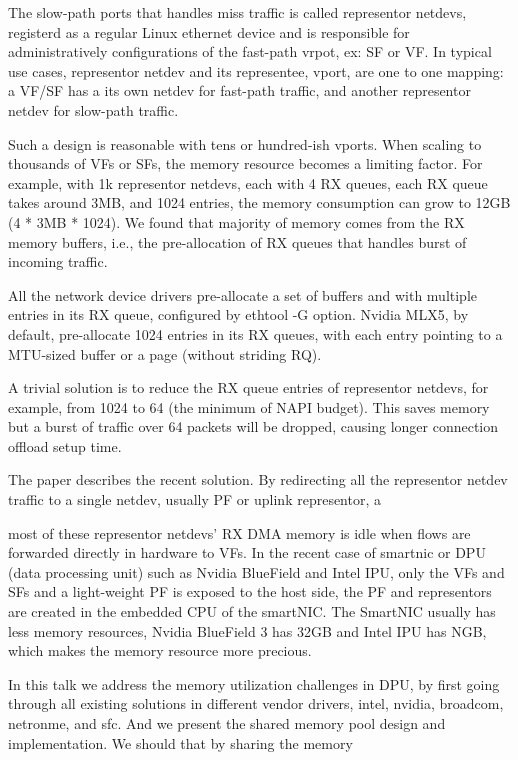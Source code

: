 \documentclass[letterpaper]{article}
\begin{document}
The slow-path ports that handles miss traffic is called representor
netdevs, registerd as a regular Linux ethernet device and is responsible
for administratively configurations of the fast-path vrpot, ex: SF or VF.
In typical use cases, representor netdev and its representee, vport,
are one to one mapping: a VF/SF has a its own netdev for fast-path traffic,
and another representor netdev for slow-path traffic.

Such a design is reasonable with tens or hundred-ish vports. When scaling
to thousands of VFs or SFs, the memory resource becomes a limiting factor.
For example, with 1k representor netdevs, each with 4 RX queues, each RX
queue takes around 3MB, and 1024 entries, the memory consumption can grow
to 12GB (4 * 3MB * 1024). We found that majority of memory comes from
the RX memory buffers, i.e., the pre-allocation of RX queues that handles
burst of incoming traffic.

All the network device drivers pre-allocate a set of buffers and with
multiple entries in its RX queue, configured by ethtool -G option.
Nvidia MLX5, by default, pre-allocate 1024 entries in its RX queues,
with each entry pointing to a MTU-sized buffer or a page (without
striding RQ).

A trivial solution is to reduce the RX queue entries of representor
netdevs, for example, from 1024 to 64 (the minimum of NAPI budget).
This saves memory but a burst of traffic over 64 packets will be dropped,
causing longer connection offload setup time.

The paper describes the recent solution. By redirecting all the representor
netdev traffic to a single netdev, usually PF or uplink representor,
a


most of these representor netdevs' RX DMA memory
is idle when flows are forwarded directly in hardware to VFs.
In the recent case of smartnic or DPU (data processing unit) such as
Nvidia BlueField and Intel IPU, only the VFs and SFs and a light-weight PF
is exposed to the host side, the PF and representors are created in the
embedded CPU of the smartNIC.
The SmartNIC usually has less memory resources, Nvidia BlueField 3 has
32GB and Intel IPU has NGB, which makes the memory resource more precious.

In this talk we address the memory utilization challenges in DPU, by
first going through all existing solutions in different vendor drivers,
intel, nvidia, broadcom, netronme, and sfc. And we present the shared
memory pool design and implementation.
We should that by sharing the memory 
\end{document}
